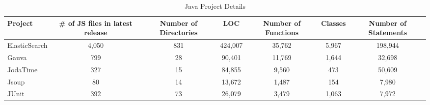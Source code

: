 \begin{table}[!tbh]
	\begin{center}
		\caption{Java Project Details }
		\label{tab:java_proj_details}
		\begin{tabular}{l| c c c c c c}
			\toprule
			\textbf{Project} & \textbf{\# of JS files in latest release} & \textbf{Number of Directories} & \textbf{LOC} & \textbf{Number of Functions} & \textbf{Classes} & \textbf{Number of Statements} \\ 
			\midrule
			ElasticSearch    & 4,050                                     & 831                            & 424,007                              & 35,762                       & 5,967            & 198,944                       \\
			Gauva            & 799                                       & 28                             & 90,401                               & 11,769                       & 1,644            & 32,698                        \\
			JodaTime         & 327                                       & 15                             & 84,855                               & 9,560                        & 473              & 50,609                        \\
			Jsoup            & 80                                        & 14                             & 13,672                               & 1,487                        & 154              & 7,980                         \\
			JUnit            & 392                                       & 73                             & 26,079                               & 3,479                        & 1,063            & 7,972                         \\ 
			\bottomrule
		\end{tabular}
	\end{center}
\end{table}

